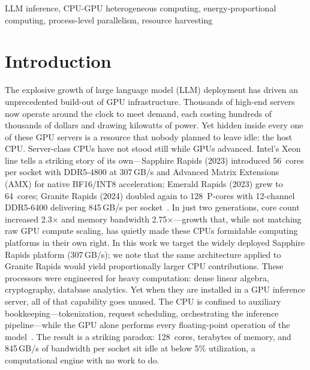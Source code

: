 \documentclass[10pt,conference]{IEEEtran}
\begin{document}
\begin{IEEEkeywords}
LLM inference, CPU-GPU heterogeneous computing, energy-proportional computing, process-level parallelism, resource harvesting
\end{IEEEkeywords}

\section{Introduction}
\label{sec:intro}

The explosive growth of large language model (LLM) deployment has driven an unprecedented build-out of GPU infrastructure.
Thousands of high-end servers now operate around the clock to meet demand, each costing hundreds of thousands of dollars and drawing kilowatts of power.
Yet hidden inside every one of these GPU servers is a resource that nobody planned to leave idle: the host CPU.
Server-class CPUs have not stood still while GPUs advanced.
Intel's Xeon line tells a striking story of its own---Sapphire Rapids (2023) introduced 56~cores per socket with DDR5-4800 at 307\,GB/s and Advanced Matrix Extensions (AMX) for native BF16/INT8 acceleration; Emerald Rapids (2023) grew to 64~cores; Granite Rapids (2024) doubled again to 128~P-cores with 12-channel DDR5-6400 delivering 845\,GB/s per socket~\cite{na2024cpullm, intel2022amx}.
In just two generations, core count increased 2.3$\times$ and memory bandwidth 2.75$\times$---growth that, while not matching raw GPU compute scaling, has quietly made these CPUs formidable computing platforms in their own right.
In this work we target the widely deployed Sapphire Rapids platform (307\,GB/s); we note that the same architecture applied to Granite Rapids would yield proportionally larger CPU contributions.
These processors were engineered for heavy computation: dense linear algebra, cryptography, database analytics.
Yet when they are installed in a GPU inference server, all of that capability goes unused.
The CPU is confined to auxiliary bookkeeping---tokenization, request scheduling, orchestrating the inference pipeline---while the GPU alone performs every floating-point operation of the model~\cite{he2024xfastertransformer}.
The result is a striking paradox: 128~cores, terabytes of memory, and 845\,GB/s of bandwidth per socket sit idle at below 5\% utilization, a computational engine with no work to do.
\end{document}
